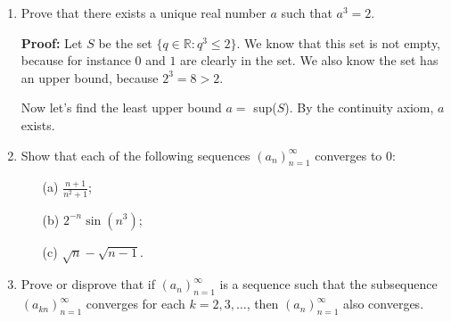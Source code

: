 \documentclass[11pt]{article}
\begin{document}
\begin{enumerate}
\bigskip
\rightline{$\Box$}

\item
Prove that there exists a unique real number $a$ such that $a^3 = 2$. 

\bigskip
\textbf{Proof: } Let $S$ be the set $\{q \in \mathbb{R} : q^3 \leq 2\}$. We know that this set is not empty, because for instance $0$ and $1$ are clearly in the set. We also know the set has an upper bound, because $2^3 = 8 > 2$. 

\medskip
Now let's find the least upper bound $a = $ sup($S$). By the continuity axiom, $a$ exists. %

\item
Show that each of the following sequences $(a_n)_{n=1}^\infty$ converges to $0$:
\begin{itemize}
\item[(a)] $\frac{n+1}{n^2 + 1}$;
\item[(b)] $2^{-n} \sin(n^3)$;
\item[(c)] $\sqrt{n} - \sqrt{n-1}$.
\end{itemize}


\item
Prove or disprove that if $(a_n)_{n=1}^\infty$ is a sequence such that the subsequence $(a_{kn})_{n=1}^\infty$ converges for each $k = 2, 3, \dots$, then $(a_n)_{n=1}^\infty$ also converges.

\end{enumerate}
\end{document}

